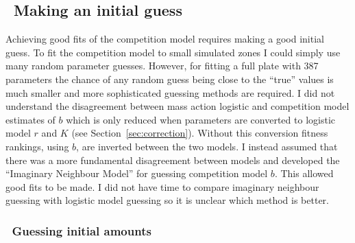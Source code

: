 
\subsection{\thesubsection~Making an initial guess}
\label{sec:initial_guess}

Achieving good fits of the competition model requires making a good
initial guess. To fit the competition model to small simulated zones I
could simply use many random parameter guesses. However, for fitting a
full plate with 387 parameters the chance of any random guess being
close to the ``true'' values is much smaller and more sophisticated
guessing methods are required. I did not understand the disagreement
between mass action logistic and competition model estimates of \(b\)
which is only reduced when parameters are converted to logistic model
\(r\) and \(K\) (see Section~\ref{sec:correction}). Without this
conversion fitness rankings, using \(b\), are inverted between the two
models. I instead assumed that there was a more fundamental
disagreement between models and developed the ``Imaginary Neighbour
Model'' for guessing competition model \(b\). This allowed good fits
to be made. I did not have time to compare imaginary neighbour
guessing with logistic model guessing so it is unclear which method is
better.

\subsubsection{\thesubsubsection~Guessing initial amounts}
\label{sec:guessing_amounts}

